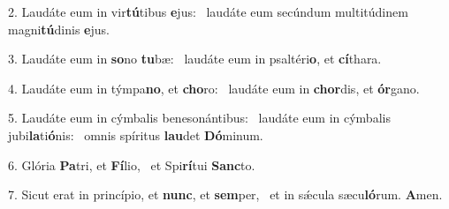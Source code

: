 2. Laudáte eum in vir\textbf{tú}tibus \textbf{e}jus: \ast\  laudáte eum secúndum multitúdinem magni\textbf{tú}dinis \textbf{e}jus.\

3. Laudáte eum in \textbf{so}no \textbf{tu}bæ: \ast\  laudáte eum in psaltéri\textbf{o}, et \textbf{cí}thara.\

4. Laudáte eum in týmpa\textbf{no}, et \textbf{cho}ro: \ast\  laudáte eum in \textbf{chor}dis, et \textbf{ór}gano.\

5. Laudáte eum in cýmbalis benesonántibus: \dag\  laudáte eum in cýmbalis jubi\textbf{la}ti\textbf{ó}nis: \ast\  omnis spíritus \textbf{lau}det \textbf{Dó}minum.\

6. Glória \textbf{Pa}tri, et \textbf{Fí}lio, \ast\  et Spi\textbf{rí}tui \textbf{Sanc}to.\

7. Sicut erat in princípio, et \textbf{nunc}, et \textbf{sem}per, \ast\  et in sǽcula sæcu\textbf{ló}rum. \textbf{A}men.\

